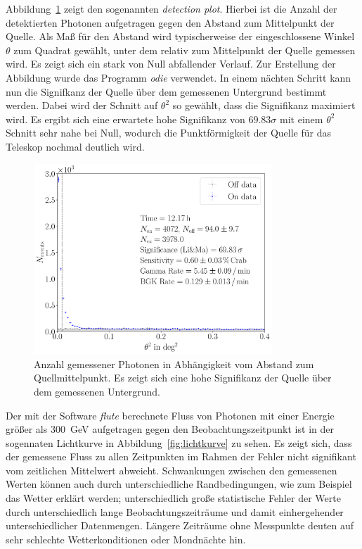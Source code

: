 Abbildung~\ref{fig:detectionplot} zeigt den sogenannten \textit{detection plot}.
Hierbei ist die Anzahl der detektierten Photonen aufgetragen gegen den Abstand
zum Mittelpunkt der Quelle. Als Maß für den Abstand wird typischerweise
der eingeschlossene Winkel $\theta$ zum Quadrat gewählt, unter dem relativ zum
Mittelpunkt der Quelle gemessen wird. Es zeigt sich ein stark von Null
abfallender Verlauf. Zur Erstellung der Abbildung wurde das Programm
\textit{odie} verwendet. In einem nächten Schritt kann nun die Signifkanz der
Quelle über dem gemessenen Untergrund bestimmt werden. Dabei wird der Schnitt
auf $\theta^2$ so gewählt, dass die Signifikanz maximiert wird. Es ergibt sich
eine erwartete hohe Signifikanz von $\num{69.83}\sigma$ mit einem $\theta^2$
Schnitt sehr nahe bei Null, wodurch die Punktförmigkeit der Quelle für das
Teleskop nochmal deutlich wird.

\begin{figure}[H]
  \centering
  \includegraphics[width=0.8\textwidth]{figures/odie_thetasquared.pdf}
  \caption{Anzahl gemessener Photonen in Abhängigkeit vom Abstand zum
  Quellmittelpunkt. Es zeigt sich eine hohe Signifikanz der Quelle über dem
  gemessenen Untergrund.}
  \label{fig:detectionplot}
\end{figure}

Der mit der Software \textit{flute} berechnete Fluss von Photonen mit einer
Energie größer als \SI{300}{\giga\electronvolt} aufgetragen gegen den
Beobachtungszeitpunkt ist in der sogennaten Lichtkurve in
Abbildung~\ref{fig:lichtkurve} zu sehen. Es zeigt sich, dass der gemessene Fluss
zu allen Zeitpunkten im Rahmen der Fehler nicht signifikant vom zeitlichen
Mittelwert abweicht. Schwankungen zwischen den gemessenen Werten können
auch durch unterschiedliche Randbedingungen, wie zum Beispiel das Wetter erklärt
werden; unterschiedlich große statistische Fehler der Werte durch
unterschiedlich lange Beobachtungszeiträume und damit einhergehender
unterschiedlicher Datenmengen. Längere Zeiträume ohne Messpunkte deuten auf
sehr schlechte Wetterkonditionen oder Mondnächte hin.


